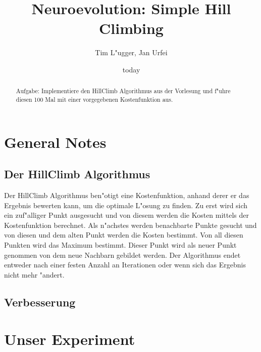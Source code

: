 \documentclass{hbrs-ecta-report}
\begin{document}

\title{Neuroevolution: Simple Hill Climbing}
\subtitle{}

\author{
\alignauthor
Tim L"ugger, Jan Urfei
}

\date{today}
\maketitle
\begin{abstract}
Aufgabe: Implementiere den HillClimb Algorithmus aus der Vorlesung und f"uhre diesen 100 Mal mit einer vorgegebenen Kostenfunktion aus.
\end{abstract}

\section{General Notes}


\subsection{Der HillClimb Algorithmus}
Der HillClimb Algorithmus ben"otigt eine Kostenfunktion, anhand derer er das Ergebnis bewerten kann, um die optimale L"osung zu finden. Zu erst wird sich ein zuf"alliger Punkt ausgesucht und von diesem werden die Kosten mittels der Kostenfunktion berechnet. Als n"achstes werden benachbarte Punkte gesucht und von diesen und dem alten Punkt werden die Kosten bestimmt. Von all diesen Punkten wird das Maximum bestimmt. Dieser Punkt wird als neuer Punkt genommen von dem neue Nachbarn gebildet werden. Der Algorithmus endet entweder nach einer festen Anzahl an Iterationen oder wenn sich das Ergebnis nicht mehr "andert.

\subsection{Verbesserung}

\section{Unser Experiment}
\end{document}
